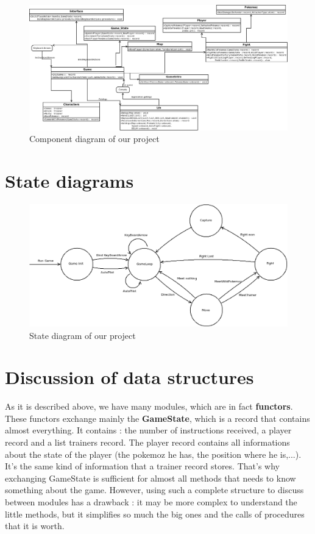 \documentclass[12pt, a4paper]{article}
\begin{document}
\begin{landscape}

\begin{figure}

\includegraphics[width=\linewidth]{Diagramme1.png}
\caption{Component diagram of our project}
\end{figure}

\end{landscape}


\section{State diagrams}

\begin{figure}
 \includegraphics[width=\linewidth]{State_diagram_oz.png}
 \caption{State diagram of our project}
\end{figure}


\section{Discussion of data structures}

As it is described above, we have many \og{}modules\fg{}, which are in fact \textbf{functors}. These functors exchange mainly the \textbf{GameState}, which is a record that contains almost everything.
It contains : the number of instructions received, a player record and a list trainers record. The player record contains all informations about the state of the player (the pokemoz he has, the position where he is,...). 
It's the same kind of information that a trainer record stores. 
That's why exchanging GameState is sufficient for almost all methods that needs to know something about the game. However, using such a complete structure to discuss between modules has a drawback : it may be more complex to understand the \og{}little methods\fg{}, but it simplifies so much the big ones and the calls of procedures that it is worth.
\end{document}
